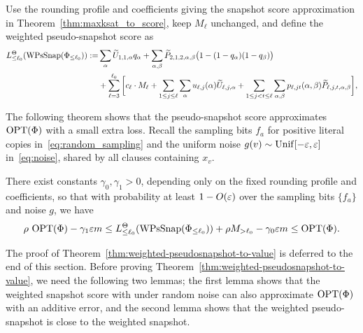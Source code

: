 \begin{definition}
\label{def:weighted-pseudosnapshot-score} 
Use the rounding profile and coefficients giving the snapshot score approximation in Theorem~\ref{thm:maxksat_to_score}, keep $M_\ell$ unchanged, and define the weighted pseudo-snapshot score as
\[
\begin{aligned}
  L_{\le\ell_0}^\Theta(\operatorname{WPsSnap}(\Phi_{\le\ell_0}))
  := &\sum_\alpha \widetilde U_{1,1,\alpha}q_\alpha
    +\sum_{\alpha,\beta}\widetilde  P_{2,1,2,\alpha,\beta}
      \bigl(1-(1-q_\alpha)(1-q_\beta)\bigr)\\
  &+\sum_{\ell=3}^{\ell_0} \bigg[   c_{\ell}\cdot M_{\ell} +\sum_{1\le j\le \ell} \sum_\alpha u_{\ell,j}(\alpha) \widetilde  U_{\ell,j,\alpha}
    +\sum_{1\le j<t\le\ell} \sum_{\alpha,\beta}
      p_{\ell,jt}(\alpha,\beta) \widetilde  P_{\ell,j,t,\alpha,\beta} \bigg],
\end{aligned}
\]
\end{definition}






The following theorem shows that the pseudo-snapshot score approximates $\operatorname{OPT}(\Phi)$ with a small extra loss. Recall the sampling bits $f_a$ for positive literal copies in~\eqref{eq:random_sampling} and the uniform noise $g(v)\sim\operatorname{Unif}[-\varepsilon,\varepsilon]$ in~\eqref{eq:noise}, shared by all clauses containing $x_v$.









\begin{theorem}
\label{thm:weighted-pseudosnapshot-to-value}
There exist constants $\gamma_0,\gamma_1>0$, depending only on the fixed rounding profile and coefficients, so that with probability at least $1-O(\varepsilon)$ over the sampling bits $\{f_a\}$ and noise $g$, we have
\[
  \rho\,\operatorname{OPT}(\Phi)-\gamma_1\varepsilon m
  \le L_{\le\ell_0}^\Theta(\operatorname{WPsSnap}(\Phi_{\le\ell_0}))
     +\rho M_{>\ell_0}-\gamma_0\varepsilon m
  \le\operatorname{OPT}(\Phi).
\]
\end{theorem}
The proof of Theorem~\ref{thm:weighted-pseudosnapshot-to-value} is deferred to the end of this  section. Before proving Theorem~\ref{thm:weighted-pseudosnapshot-to-value}, we need the following two lemmas; the first lemma shows   that the weighted snapshot score with under random noise can also  approximate $\operatorname{OPT}(\Phi)$ with an additive error, and the second lemma shows that the weighted pseudo-snapshot is close to the weighted snapshot.


